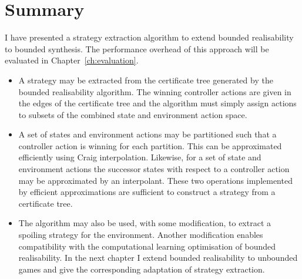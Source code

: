 \section{Summary}


I have presented a strategy extraction algorithm to extend bounded realisability to bounded synthesis. The performance overhead of this approach will be evaluated in Chapter~\ref{ch:evaluation}.

\begin{itemize}
    \item A strategy may be extracted from the certificate tree generated by the bounded realisability algorithm. The winning controller actions are given in the edges of the certificate tree and the algorithm must simply assign actions to subsets of the combined state and environment action space.

    \item A set of states and environment actions may be partitioned such that a controller action is winning for each partition. This can be approximated efficiently using Craig interpolation.  Likewise, for a set of state and environment actions the successor states with respect to a controller action may be approximated by an interpolant. These two operations implemented by efficient approximations are sufficient to construct a strategy from a certificate tree.

    \item The algorithm may also be used, with some modification, to extract a spoiling strategy for the environment. Another modification enables compatibility with the computational learning optimisation of bounded realisability. In the next chapter I extend bounded realisability to unbounded games and give the corresponding adaptation of strategy extraction.

\end{itemize}
